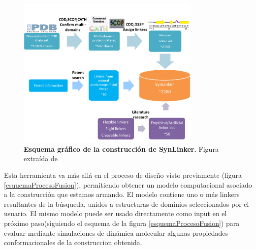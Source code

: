 \begin{figure}[ht]
\centering
\includegraphics[width=0.8\textwidth]{img/synLink.png} 
\caption{\textbf{Esquema gráfico de la construcción de SynLinker.} Figura extraída de \cite{liu2015synlinker}} 
\label{SynLinker}
\end{figure}

Esta herramienta va más allá en el proceso de diseño visto previamente (figura \ref{esquemaProcesoFusion}), permitiendo obtener un modelo computacional asociado a la construcción que estamos armando. 
El modelo contiene uno o más linkers resultantes de la búsqueda, unidos a estructuras de dominios seleccionados por el usuario.
El mismo modelo puede ser usado directamente como input en el próximo paso(siguiendo el esquema de la figura \ref{esquemaProcesoFusion}) para evaluar mediante simulaciones 
de dinámica molecular algunas propiedades conformacionales de la construccion obtenida.


